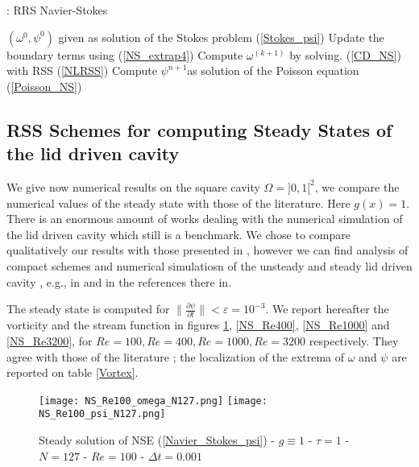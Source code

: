 {\begin{center}
\begin{minipage}[H]{12cm}
  \begin{algorithm}[H]
    \caption{: RRS Navier-Stokes}\label{NS}
    \begin{algorithmic}[1]
        \State  $(\omega^0, \psi^0)$ given as solution of the Stokes problem (\ref{Stokes_psi})
             \State Update  the boundary terms using  (\ref{NS_extrap4})
              \State Compute  $\omega^{(k+1)}$ by solving. (\ref{CD_NS}) with RSS (\ref{NLRSS})
               \State Compute $\psi^{n+1}$as solution of the  Poisson equation (\ref{Poisson_NS})      
            \EndFor
    \end{algorithmic}
    \end{algorithm}
\end{minipage}
\end{center}




\subsection{RSS Schemes for computing Steady States of the lid driven cavity}

We give now numerical results on the square cavity $\Omega=]0,1[^2$, we compare the numerical values of the steady state with those of the literature. Here $g(x)=1$.
There is an enormous amount of works dealing with the numerical simulation of the lid driven cavity which still is a benchmark. We chose to compare qualitatively our results with
those presented in \cite{BenArtziCroisille,BruneauJouron,Ghia,Goyon}, however we can find
analysis of compact schemes and numerical simulatiosn of the unsteady and steady lid driven cavity , e.g., in \cite{ChengWang,LiTangFornberg} and in the references there in.


The steady state is computed for $\| \frac{\partial \psi }{\partial t}  \| < \varepsilon = 10^{-3}$. We report hereafter the vorticity and the stream function in figures \ref{NS_Re100}, \ref{NS_Re400}, \ref{NS_Re1000} and \ref{NS_Re3200}, for $Re=100, Re=400, Re=1000, Re=3200$ respectively. They agree with those of the literature \cite{BenArtziCroisille,BruneauJouron,Ghia,Goyon}; the localization of the extrema of $\omega$ and $\psi$ are reported on table \ref{Vortex}.

\begin{figure}[!ht]
\begin{center}
\texttt{[image: NS\_Re100\_omega\_N127.png]}
\texttt{[image: NS\_Re100\_psi\_N127.png]}\\
\caption{Steady solution of NSE (\ref{Navier_Stokes_psi}) - $g \equiv 1$ - $\tau = 1$ -  $N=127$ - $Re = 100$ - $\Delta t = 0.001$}
\label{NS_Re100}
\end{center}
\end{figure}

}

